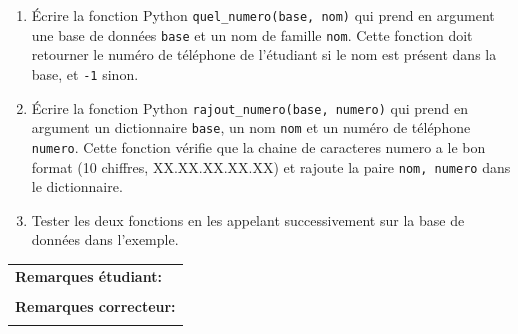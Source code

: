 \documentclass[a4paper,11pt]{article}
\begin{document}
\begin{enumerate}
   
    \item Écrire la fonction Python \texttt{quel\_numero(base, nom)} qui prend en argument une base de données
    \texttt{base} et un nom de famille \texttt{nom}.  
    Cette fonction doit retourner le numéro de téléphone de l’étudiant si le nom est présent dans la base,
    et \texttt{-1} sinon.

    \item Écrire la fonction Python \texttt{rajout\_numero(base, numero)} qui prend en argument un dictionnaire 
    \texttt{base}, un nom \texttt{nom} et un numéro de téléphone \texttt{numero}.  
    Cette fonction vérifie que la chaine de caracteres numero a le bon format (10 chiffres, XX.XX.XX.XX.XX) 
    et rajoute la paire \texttt{nom, numero} dans le dictionnaire. 
    
    
    \item Tester les deux fonctions en les appelant successivement sur la base de données dans l'exemple. 
    \end{enumerate}

\vspace{1 cm}
\begin{table}[h!]
\centering
\renewcommand{\arraystretch}{1.4} %
\begin{tabular}{|p{15cm}|}
\hline
\textbf{Remarques étudiant:}    \\
 \\
\hline
\textbf{Remarques correcteur:}  \\
 \\
\hline
\end{tabular}
\end{table}
\end{document}
